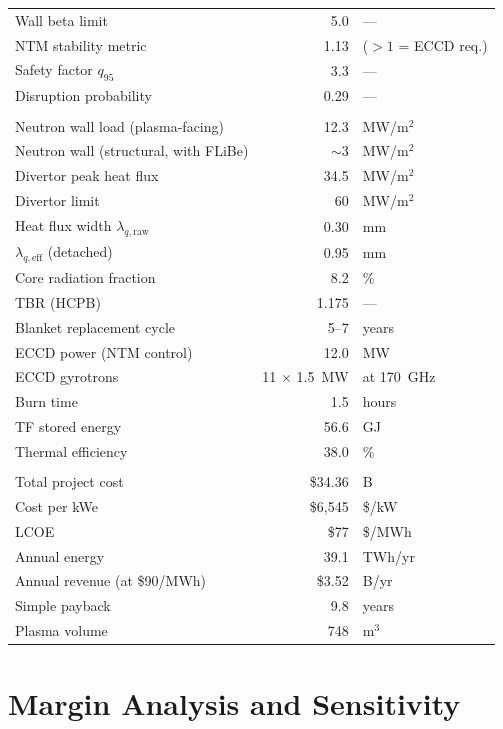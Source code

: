 \documentclass[11pt,a4paper]{article}
\begin{document}
\begin{table}[htbp]
\begin{tabular}{lrl}
Wall beta limit & 5.0 & --- \\
NTM stability metric & 1.13 & ($> 1$ = ECCD req.) \\
Safety factor $q_{95}$ & 3.3 & --- \\
Disruption probability & 0.29 & --- \\
\addlinespace
\multicolumn{3}{l}{\textbf{Engineering}} \\
Neutron wall load (plasma-facing) & 12.3 & MW/m$^2$ \\
Neutron wall (structural, with FLiBe) & $\sim$3 & MW/m$^2$ \\
Divertor peak heat flux & 34.5 & MW/m$^2$ \\
Divertor limit & 60 & MW/m$^2$ \\
Heat flux width $\lambda_{q,\text{raw}}$ & 0.30 & mm \\
$\lambda_{q,\text{eff}}$ (detached) & 0.95 & mm \\
Core radiation fraction & 8.2 & \% \\
TBR (HCPB) & 1.175 & --- \\
Blanket replacement cycle & 5--7 & years \\
ECCD power (NTM control) & 12.0 & MW \\
ECCD gyrotrons & 11 $\times$ 1.5~MW & at 170~GHz \\
Burn time & 1.5 & hours \\
TF stored energy & 56.6 & GJ \\
Thermal efficiency & 38.0 & \% \\
\addlinespace
\multicolumn{3}{l}{\textbf{Cost and economics}} \\
Total project cost & \$34.36 & B \\
Cost per kWe & \$6,545 & \$/kW \\
LCOE & \$77 & \$/MWh \\
Annual energy & 39.1 & TWh/yr \\
Annual revenue (at \$90/MWh) & \$3.52 & B/yr \\
Simple payback & 9.8 & years \\
Plasma volume & 748 & m$^3$ \\
\bottomrule
\end{tabular}
\end{table}

\section{Margin Analysis and Sensitivity}
\end{document}

